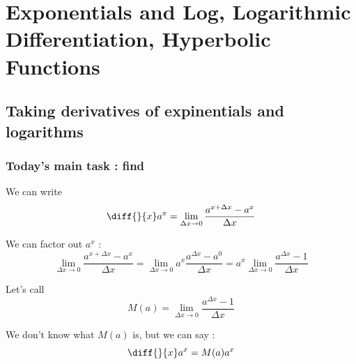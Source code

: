 

\chapter{Exponentials and Log, Logarithmic Differentiation, Hyperbolic Functions}

\bigbreak
\section{Taking derivatives of expinentials and logarithms}

\subsection{Today's main task : find }

We can write $$ \diff{}{x} a^x = \lim_{\Delta x \to 0} \frac{a^{x+\Delta x} - a^x}{\Delta x} $$

We can factor out $a^x$ : 
$$ \lim_{\Delta x \to 0} \frac{a^{x+\Delta x}-a^x}{\Delta x} 
	= \lim_{\Delta x \to 0} a^x \frac{a^{\Delta x} - a^0}{\Delta x}
	= a^x \lim_{\Delta x \to 0} \frac{a^{\Delta x} - 1}{\Delta x}
$$

Let's call $$ M(a) = \lim_{\Delta x \to 0} \frac{a^{\Delta x} - 1}{\Delta x} $$

We don't know what $M(a)$ is, but we can say : $$ \diff{}{x} a^x = M(a) a^x $$

